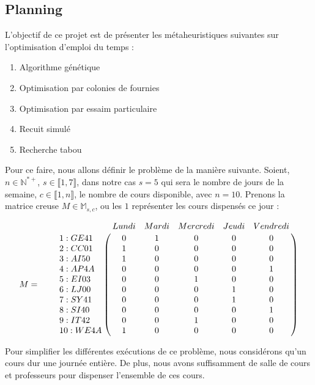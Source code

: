

\subsection{Planning}

L'objectif de ce projet est de présenter les métaheuristiques suivantes sur l'optimisation d'emploi du temps :
\begin{enumerate}
    \item Algorithme génétique
    \item Optimisation par colonies de fournies
    \item Optimisation par essaim particulaire
    \item Recuit simulé
    \item Recherche tabou
\end{enumerate}

Pour ce faire, nous allons définir le problème de la manière suivante.
Soient, $n \in \mathbb{N}^{*+}$, $s \in \llbracket 1 ,7 \rrbracket$, dans notre cas $s = 5$ qui sera le nombre de jours de la semaine, $c \in \llbracket 1 ,n \rrbracket$, le nombre de cours disponible, avec $n = 10 $.
Prenons la matrice creuse $M \in \mathbb{M}_{s,c}$, ou les $1$ représenter les cours dispensés ce jour :

\[
    M = \qquad \bordermatrix{~  & \tikzmark{harrowleft} Lundi & Mardi & Mercredi & Jeudi
    & Vendredi\tikzmark{harrowright}  \cr
    \tikzmark{varrowtop}
    1 : GE41 & 0 & 1 & 0 & 0 & 0 \cr
    2 : CC01 & 1 & 0 & 0 & 0 & 0 \cr
    3 : AI50 & 1 & 0 & 0 & 0 & 0 \cr
    4 : AP4A & 0 & 0 & 0 & 0 & 1 \cr
    5 : EI03 & 0 & 0 & 1 & 0 & 0 \cr
    6 : LJ00 & 0 & 0 & 0 & 1 & 0 \cr
    7 : SY41 & 0 & 0 & 0 & 1 & 0 \cr
    8 : SI40 & 0 & 0 & 0 & 0 & 1 \cr
    9 : IT42 & 0 & 0 & 1 & 0 & 0 \cr
    \tikzmark{varrowbottom} 10 : WE4A & 1 & 0 & 0 & 0 & 0 \cr
    }
\]

Pour simplifier les différentes exécutions de ce problème, nous considérons qu'un cours dur une journée entière.
De plus, nous avons suffisamment de salle de cours et professeurs pour dispenser l'ensemble de ces cours.

